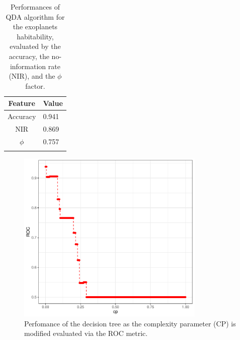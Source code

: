 \documentclass[
12pt, %
a4paper, %
oneside, %
headinclude,footinclude, %
BCOR5mm, %
]{scrartcl}
\begin{document}
\begin{table}[]
\caption{Performances of QDA algorithm for the exoplanets habitability, evaluated by the accuracy, the no-information rate (NIR), and the $\phi$ factor.}
\begin{center}
\begin{tabular}{l|l}
\multicolumn{1}{c|}{Feature} & Value \\ \hline
\multicolumn{1}{c|}{Accuracy} & 0.941 \\ \hline
\multicolumn{1}{c|}{NIR} & 0.869 \\ \hline
\multicolumn{1}{c|}{$\phi$} & 0.757 \\ 
\label{QDA_perf_tab}
\end{tabular}
\end{center}
\end{table}



\begin{figure}[h]
\begin{center}
\includegraphics[width=0.8\textwidth]{Pic/cp_vs_ROC.pdf}
\caption{Perfomance of the decision tree as the complexity parameter (CP) is modified evaluated via the ROC metric. }
\label{cp_vs_ROC}
\end{center}
\end{figure}
\end{document}
